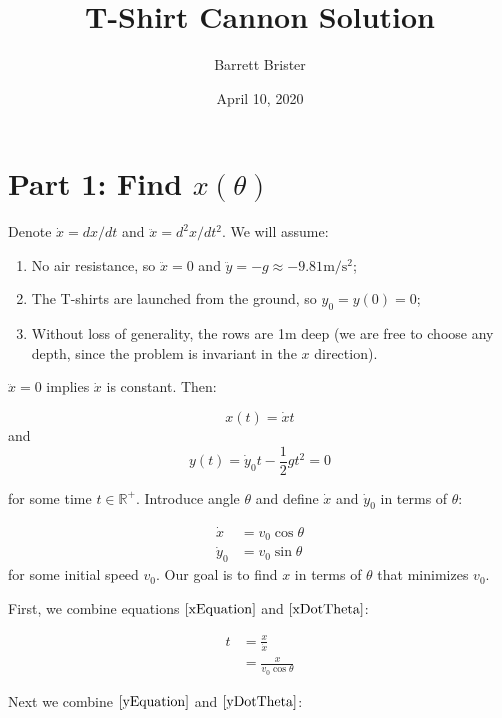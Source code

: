 \documentclass[]{article}
\title{T-Shirt Cannon Solution}
\author{Barrett Brister}
\date{April 10, 2020}
\begin{document}
\maketitle
\section*{Part 1: Find $x(\theta)$}
\noindent Denote $\dot{x}=dx/dt$ and $\ddot{x}=d^2x/dt^2$. We will assume:
\begin{enumerate}[noitemsep]
	\item No air resistance, so $\ddot{x}=0$ and $\ddot{y}=-g \approx -9.81 \mathrm{m}/\mathrm{s}^2$;
	\item The T-shirts are launched from the ground, so $y_0 = y(0) = 0$;
	\item Without loss of generality, the rows are 1m deep (we are free to choose any depth, since the problem is invariant in the $x$ direction).
\end{enumerate}

\noindent$\ddot{x}=0$ implies $\dot{x}$ is constant. Then:

\begin{equation}\label{xEquation}
x(t) = \dot{x} t
\end{equation}
\noindent and
\begin{equation}\label{yEquation}
y(t) = \dot{y}_0 t - \frac{1}{2}gt^2 = 0
\end{equation}

\noindent for some time $t \in \mathbb{R^+}$.
Introduce angle $\theta$ and define $\dot{x}$ and $\dot{y}_0$ in terms of $\theta$:

\begin{subequations}
\begin{align}
\dot{x} &= v_0 \cos\theta \label{xDotTheta}\\
\dot{y}_0 &= v_0 \sin\theta \label{yDotTheta}
\end{align}
\end{subequations}
\noindent for some initial speed $v_0$. Our goal is to find $x$ in terms of $\theta$ that minimizes $v_0$.

First, we combine equations $\eqref{xEquation}$ and $\eqref{xDotTheta}$:

\begin{align}
t &= \frac{x}{\dot{x}}\nonumber\\ &= \frac{x}{v_0 \cos\theta}
\end{align}

\noindent Next we combine $\eqref{yEquation}$ and $\eqref{yDotTheta}$:
\end{document}
